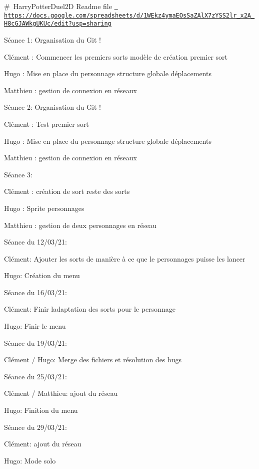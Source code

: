 \#~Harry\+Potter\+Duel2D Readme file \href{https://docs.google.com/spreadsheets/d/1WEkz4ymaEOsSaZAlX7zYSS2lr_x2A_H8cGJAWkgUKUc/edit?usp=sharing}{\texttt{ https\+://docs.\+google.\+com/spreadsheets/d/1\+W\+Ekz4yma\+E\+Os\+Sa\+Z\+Al\+X7z\+Y\+S\+S2lr\+\_\+x2\+A\+\_\+\+H8c\+G\+J\+A\+Wkg\+U\+K\+Uc/edit?usp=sharing}}

Séance 1\+: Organisation du Git !

Clément \+: Commencer les premiers sorts modèle de création premier sort

Hugo \+: Mise en place du personnage structure globale déplacements

Matthieu \+: gestion de connexion en réseaux

Séance 2\+: Organisation du Git !

Clément \+: Test premier sort

Hugo \+: Mise en place du personnage structure globale déplacements

Matthieu \+: gestion de connexion en réseaux

Séance 3\+:

Clément \+: création de sort reste des sorts

Hugo \+: Sprite personnages

Matthieu \+: gestion de deux personnages en réseau

Séance du 12/03/21\+:

Clément\+: Ajouter les sorts de manière à ce que le personnages puisse les lancer

Hugo\+: Création du menu

Séance du 16/03/21\+:

Clément\+: Finir l\textquotesingle{}adaptation des sorts pour le personnage

Hugo\+: Finir le menu

Séance du 19/03/21\+:

Clément / Hugo\+: Merge des fichiers et résolution des bugs

Séance du 25/03/21\+:

Clément / Matthieu\+: ajout du réseau

Hugo\+: Finition du menu

Séance du 29/03/21\+:

Clément\+: ajout du réseau

Hugo\+: Mode solo 